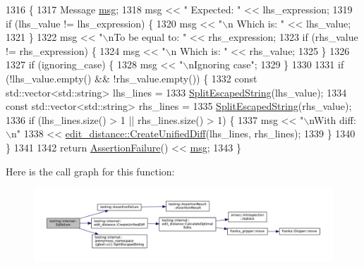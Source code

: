 \begin{DoxyCode}
1316                                               \{
1317   Message \hyperlink{namespacebattery__monitor__node_ab1920c64448816edd4064e494275fdff}{msg};
1318   msg << \textcolor{stringliteral}{"      Expected: "} << lhs\_expression;
1319   \textcolor{keywordflow}{if} (lhs\_value != lhs\_expression) \{
1320     msg << \textcolor{stringliteral}{"\(\backslash\)n      Which is: "} << lhs\_value;
1321   \}
1322   msg << \textcolor{stringliteral}{"\(\backslash\)nTo be equal to: "} << rhs\_expression;
1323   \textcolor{keywordflow}{if} (rhs\_value != rhs\_expression) \{
1324     msg << \textcolor{stringliteral}{"\(\backslash\)n      Which is: "} << rhs\_value;
1325   \}
1326 
1327   \textcolor{keywordflow}{if} (ignoring\_case) \{
1328     msg << \textcolor{stringliteral}{"\(\backslash\)nIgnoring case"};
1329   \}
1330 
1331   \textcolor{keywordflow}{if} (!lhs\_value.empty() && !rhs\_value.empty()) \{
1332     \textcolor{keyword}{const} std::vector<std::string> lhs\_lines =
1333         \hyperlink{namespacetesting_1_1internal_1_1anonymous__namespace_02gtest_8cc_03_a87e3d38ad422ce7018c6fcd4d1f3a938}{SplitEscapedString}(lhs\_value);
1334     \textcolor{keyword}{const} std::vector<std::string> rhs\_lines =
1335         \hyperlink{namespacetesting_1_1internal_1_1anonymous__namespace_02gtest_8cc_03_a87e3d38ad422ce7018c6fcd4d1f3a938}{SplitEscapedString}(rhs\_value);
1336     \textcolor{keywordflow}{if} (lhs\_lines.size() > 1 || rhs\_lines.size() > 1) \{
1337       msg << \textcolor{stringliteral}{"\(\backslash\)nWith diff:\(\backslash\)n"}
1338           << \hyperlink{namespacetesting_1_1internal_1_1edit__distance_ac4c24a581ff433d7aca7ed12c9133fb1}{edit\_distance::CreateUnifiedDiff}(lhs\_lines, rhs\_lines);
1339     \}
1340   \}
1341 
1342   \textcolor{keywordflow}{return} \hyperlink{namespacetesting_a75cb789614cb1c28c34627a4a3c053df}{AssertionFailure}() << \hyperlink{namespacebattery__monitor__node_ab1920c64448816edd4064e494275fdff}{msg};
1343 \}
\end{DoxyCode}
Here is the call graph for this function\+:
\nopagebreak
\begin{figure}[H]
\begin{center}
\leavevmode
\includegraphics[width=350pt]{namespacetesting_1_1internal_a08725846ff184d3e79bcf5be4df19157_cgraph}
\end{center}
\end{figure}
